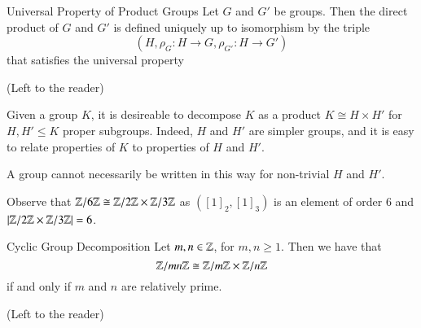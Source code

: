 \documentclass[12pt, a4paper, twoside, openright, titlepage]{book}
\begin{document}
\begin{namthm}{Universal Property of Product Groups}{}
        Let $G$ and $G'$ be groups. Then the direct product of $G$ and $G'$ is defined uniquely up to isomorphism by the triple \begin{equation}
                (H,\rho_G:H\rightarrow G, \rho_{G'}:H\rightarrow G')
        \end{equation}
        that satisfies the universal property \begin{center}
        \end{center}
\end{namthm}
\begin{proof*}{}{}
        (Left to the reader)
\end{proof*}


\begin{rmk}{}{}
        Given a group $K$, it is desireable to decompose $K$ as a product $K \cong H \times H'$ for $H,H' \leq K$ proper subgroups. Indeed, $H$ and $H'$ are simpler groups, and it is easy to relate properties of $K$ to properties of $H$ and $H'$.
\end{rmk}


\begin{note*}{}{}
        A group cannot necessarily be written in this way for non-trivial $H$ and $H'$.
\end{note*}


\begin{eg}{}{}
        Observe that $\mathbb Z/6\mathbb Z \cong \mathbb Z/2\mathbb Z \times \mathbb Z/3\mathbb Z$ as $([1]_2,[1]_3)$ is an element of order $6$ and $|\mathbb Z/2\mathbb Z\times \mathbb Z/3\mathbb Z| = 6$.
\end{eg}

\begin{prop}{Cyclic Group Decomposition}{}
        Let $m,n \in \mathbb Z$, for $m,n \geq 1$. Then we have that \begin{equation}
                \mathbb Z/mn\mathbb Z \cong \mathbb Z/m\mathbb Z\times \mathbb Z/n\mathbb Z
        \end{equation}
        if and only if $m$ and $n$ are relatively prime.
\end{prop}
\begin{proof*}{}{}
        (Left to the reader)
\end{proof*}
\end{document}
